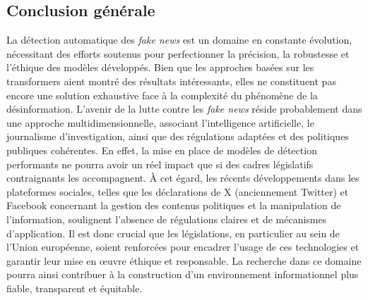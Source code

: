 \documentclass[a4paper,12pt, twocolumn]{article}
\begin{document}
\begin{twocolumn}
\subsection{Conclusion générale}
La détection automatique des \textit{fake news} est un domaine en constante évolution, nécessitant des efforts soutenus pour perfectionner la précision, la robustesse et l’éthique des modèles développés. Bien que les approches basées sur les transformers aient montré des résultats intéressants, elles ne constituent pas encore une solution exhaustive face à la complexité du phénomène de la désinformation. L'avenir de la lutte contre les \textit{fake news} réside probablement dans une approche multidimensionnelle, associant l'intelligence artificielle, le journalisme d’investigation, ainsi que des régulations adaptées et des politiques publiques cohérentes. En effet, la mise en place de modèles de détection performants ne pourra avoir un réel impact que si des cadres législatifs contraignants les accompagnent. À cet égard, les récents développements dans les plateformes sociales, telles que les déclarations de X (anciennement Twitter) et Facebook concernant la gestion des contenus politiques et la manipulation de l’information, soulignent l'absence de régulations claires et de mécanismes d’application. Il est donc crucial que les législations, en particulier au sein de l’Union européenne, soient renforcées pour encadrer l’usage de ces technologies et garantir leur mise en œuvre éthique et responsable. La recherche dans ce domaine pourra ainsi contribuer à la construction d'un environnement informationnel plus fiable, transparent et équitable.

\end{twocolumn}

\begin{onecolumn}
\printbibliography %
\end{onecolumn}
\end{document}
